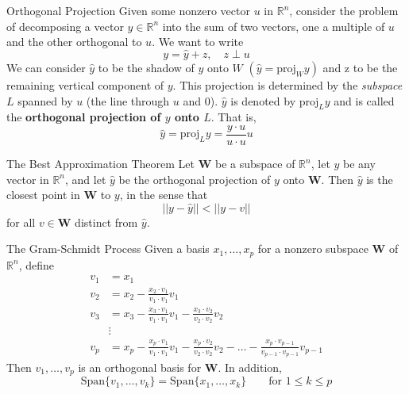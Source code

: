\begin{defbox}{Orthogonal Projection}
    Given some nonzero vector $u$ in $\mathbb{R}^n$, consider the problem of decomposing a vector $y \in \mathbb{R}^n$ into the sum of two vectors, one a multiple of $u$ and the other orthogonal to $u$. We want to write
    \[
        y = \hat{y} + z,\quad z \perp u
    \]
    We can consider $\hat{y}$ to be the shadow of $y$ onto $W$ $(\hat{y} = \text{proj}_W{y})$ and z to be the remaining vertical component of $y$. This projection is determined by the \textit{subspace} $L$ spanned by $u$ (the line through $u$ and 0). $\hat{y}$ is denoted by $\text{proj}_Ly$ and is called the \textbf{orthogonal projection of $y$ onto $L$}. That is,
    \[
        \hat{y} = \text{proj}_L{y} = \frac{y\cdot u}{u\cdot u}u
    \]
\end{defbox}
\begin{defbox}{The Best Approximation Theorem}
    Let $\mathbf{W}$ be a subspace of $\mathbb{R}^n$, let $y$ be any vector in $\mathbb{R}^n$, and let $\hat{y}$ be the orthogonal projection of $y$ onto $\mathbf{W}$. Then $\hat{y}$ is the closest point in $\mathbf{W}$ to $y$, in the sense that
    \[
        ||y - \hat{y}|| < ||y - v||
    \]
    for all $v \in \mathbf{W}$ distinct from $\hat{y}$.
\end{defbox}
\begin{defbox}{The Gram-Schmidt Process}
    Given a basis ${x_1, \dots, x_p}$ for a nonzero subspace $\mathbf{W}$ of $\mathbb{R}^n$, define
    \begin{align*}
        v_1 &= x_1\\
        v_2 &= x_2 - \frac{x_2 \cdot v_1}{v_1\cdot v_1}v_1\\
        v_3 &= x_3 - \frac{x_3 \cdot v_1}{v_1\cdot v_1}v_1 - \frac{x_3 \cdot v_2}{v_2\cdot v_2}v_2\\
        &\vdots\\
        v_p &= x_p - \frac{x_p \cdot v_1}{v_1\cdot v_1}v_1 - \frac{x_p \cdot v_2}{v_2\cdot v_2}v_2 - \dots - \frac{x_p \cdot v_{p-1}}{v_{p-1}\cdot v_{p-1}}v_{p-1}
    \end{align*}
    Then ${v_1, \dots, v_p}$ is an orthogonal basis for $\mathbf{W}$. In addition,
    \[
        \text{Span}\{v_1, \dots, v_k\} = \text{Span}\{x_1, \dots, x_k\}\quad\quad \text{for } 1 \leq k \leq p
    \]
\end{defbox}
